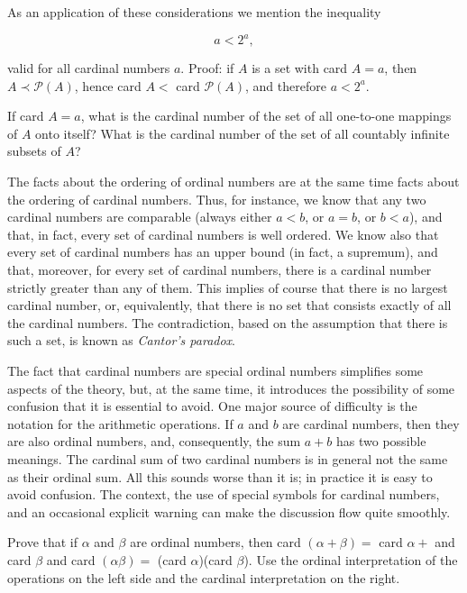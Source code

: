 As an application of these considerations we mention the inequality

\begin{equation*}
a < 2^{a},
\end{equation*}

valid for all cardinal numbers $a$. Proof: if $A$ is a set with card $A = a$, then $A \prec \mathcal{P}(A)$, hence card $A <$ card $\mathcal{P}(A)$, and therefore $a < 2^{a}$. 

\begin{named}[EXERCISE. ] If card $A = a$, what is the cardinal number of the set of all one-to-one mappings of $A$ onto itself? What is the cardinal number of the set of all countably infinite subsets of $A$?
\end{named}

The facts about the ordering of ordinal numbers are at the same time facts about the ordering of cardinal numbers. Thus, for instance, we know that any two cardinal numbers are comparable (always either $a < b$, or $a = b$, or $b < a$), and that, in fact, every set of cardinal numbers is well ordered. We know also that every set of cardinal numbers has an upper bound (in fact, a supremum), and that, moreover, for every set of cardinal numbers, there is a cardinal number strictly greater than any of them. This implies of course that there is no largest cardinal number, or, equivalently, that there is no set that consists exactly of all the cardinal numbers. The contradiction, based on the assumption that there is such a set, is known as \textit{Cantor's paradox}. 

The fact that cardinal numbers are special ordinal numbers simplifies some aspects of the theory, but, at the same time, it introduces the possibility of some confusion that it is essential to avoid. One major source of difficulty is the notation for the arithmetic operations. If $a$ and $b$ are cardinal numbers, then they are also ordinal numbers, and, consequently, the sum $a + b$ has two possible meanings. The cardinal sum of two cardinal numbers is in general not the same as their ordinal sum. All this sounds worse than it is; in practice it is easy to avoid confusion. The context, the use of special symbols for cardinal numbers, and an occasional explicit warning can make the discussion flow quite smoothly. 

\begin{named}[EXERCISE. ] Prove that if $\alpha$ and $\beta$ are ordinal numbers, then card $(\alpha + \beta ) =$ card $\alpha +$ and card $\beta$ and card $(\alpha \beta) =$ (card $\alpha$)(card $\beta$). Use the ordinal interpretation of the operations on the left side and the cardinal interpretation on the right. 
\end{named}

